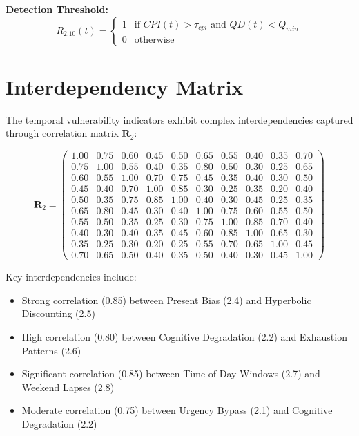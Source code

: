 \documentclass[11pt,a4paper]{article}
\begin{document}
\textbf{Detection Threshold:}
\begin{equation}
R_{2.10}(t) = \begin{cases}
1 & \text{if } CPI(t) > \tau_{cpi} \text{ and } QD(t) < Q_{min} \\
0 & \text{otherwise}
\end{cases}
\end{equation}

\section{Interdependency Matrix}

The temporal vulnerability indicators exhibit complex interdependencies captured through correlation matrix $\mathbf{R}_{2}$:

\begin{equation}
\mathbf{R}_2 = \begin{pmatrix}
1.00 & 0.75 & 0.60 & 0.45 & 0.50 & 0.65 & 0.55 & 0.40 & 0.35 & 0.70 \\
0.75 & 1.00 & 0.55 & 0.40 & 0.35 & 0.80 & 0.50 & 0.30 & 0.25 & 0.65 \\
0.60 & 0.55 & 1.00 & 0.70 & 0.75 & 0.45 & 0.35 & 0.40 & 0.30 & 0.50 \\
0.45 & 0.40 & 0.70 & 1.00 & 0.85 & 0.30 & 0.25 & 0.35 & 0.20 & 0.40 \\
0.50 & 0.35 & 0.75 & 0.85 & 1.00 & 0.40 & 0.30 & 0.45 & 0.25 & 0.35 \\
0.65 & 0.80 & 0.45 & 0.30 & 0.40 & 1.00 & 0.75 & 0.60 & 0.55 & 0.50 \\
0.55 & 0.50 & 0.35 & 0.25 & 0.30 & 0.75 & 1.00 & 0.85 & 0.70 & 0.40 \\
0.40 & 0.30 & 0.40 & 0.35 & 0.45 & 0.60 & 0.85 & 1.00 & 0.65 & 0.30 \\
0.35 & 0.25 & 0.30 & 0.20 & 0.25 & 0.55 & 0.70 & 0.65 & 1.00 & 0.45 \\
0.70 & 0.65 & 0.50 & 0.40 & 0.35 & 0.50 & 0.40 & 0.30 & 0.45 & 1.00
\end{pmatrix}
\end{equation}

Key interdependencies include:
\begin{itemize}
\item Strong correlation (0.85) between Present Bias (2.4) and Hyperbolic Discounting (2.5)
\item High correlation (0.80) between Cognitive Degradation (2.2) and Exhaustion Patterns (2.6)
\item Significant correlation (0.85) between Time-of-Day Windows (2.7) and Weekend Lapses (2.8)
\item Moderate correlation (0.75) between Urgency Bypass (2.1) and Cognitive Degradation (2.2)
\end{itemize}
\end{document}
